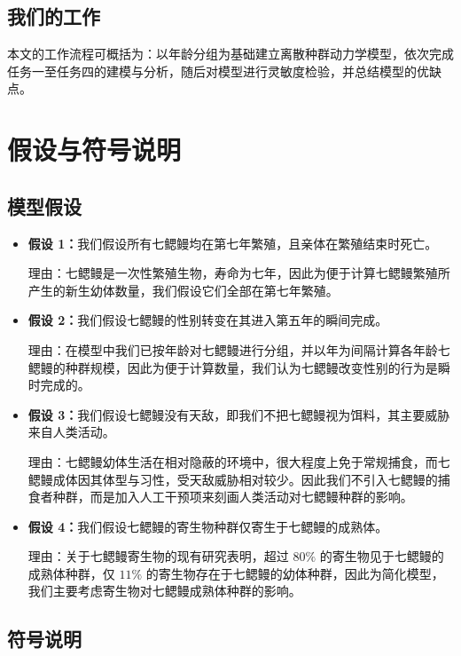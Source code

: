 \documentclass[11pt,a4paper]{ctexart}
\begin{document}
\subsection{我们的工作}

本文的工作流程可概括为：以年龄分组为基础建立离散种群动力学模型，依次完成任务一至任务四的建模与分析，随后对模型进行灵敏度检验，并总结模型的优缺点。

\section{假设与符号说明}

\subsection{模型假设}

\begin{itemize}
\item \textbf{假设 1：}我们假设所有七鳃鳗均在第七年繁殖，且亲体在繁殖结束时死亡。

理由：七鳃鳗是一次性繁殖生物，寿命为七年，因此为便于计算七鳃鳗繁殖所产生的新生幼体数量，我们假设它们全部在第七年繁殖。

\item \textbf{假设 2：}我们假设七鳃鳗的性别转变在其进入第五年的瞬间完成。

理由：在模型中我们已按年龄对七鳃鳗进行分组，并以年为间隔计算各年龄七鳃鳗的种群规模，因此为便于计算数量，我们认为七鳃鳗改变性别的行为是瞬时完成的。

\item \textbf{假设 3：}我们假设七鳃鳗没有天敌，即我们不把七鳃鳗视为饵料，其主要威胁来自人类活动。

理由：七鳃鳗幼体生活在相对隐蔽的环境中，很大程度上免于常规捕食，而七鳃鳗成体因其体型与习性，受天敌威胁相对较少。因此我们不引入七鳃鳗的捕食者种群，而是加入人工干预项来刻画人类活动对七鳃鳗种群的影响。

\item \textbf{假设 4：}我们假设七鳃鳗的寄生物种群仅寄生于七鳃鳗的成熟体。

理由：关于七鳃鳗寄生物的现有研究表明，超过 $80\%$ 的寄生物见于七鳃鳗的成熟体种群，仅 $11\%$ 的寄生物存在于七鳃鳗的幼体种群，因此为简化模型，我们主要考虑寄生物对七鳃鳗成熟体种群的影响。
\end{itemize}

\subsection{符号说明}
\end{document}
